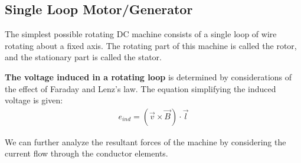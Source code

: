 \documentclass{book}
\begin{document}
\subsection{Single Loop Motor/Generator}

The simplest possible rotating DC machine consists of a single loop of wire rotating about a fixed axis. The rotating part of this machine is called the rotor, and the stationary part is called the stator.

\textbf{The voltage induced in a rotating loop} is determined by considerations of the effect of Faraday and Lenz's law. The equation simplifying the induced voltage is given:
\begin{align*}
	e_{ind} = (\vec{v} \times \vec{B}) \cdot \vec{l}
\end{align*}

We can further analyze the resultant forces of the machine by considering the current flow through the conductor elements. 
\end{document}
